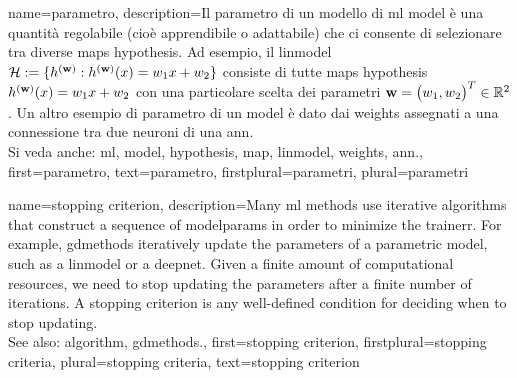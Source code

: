 {name={parametro},
	description={Il parametro di un modello di \gls{ml} \gls{model} è una quantità regolabile (cioè apprendibile o 
	adattabile) che ci consente di selezionare tra diverse \glspl{map} \gls{hypothesis}. Ad esempio, il \gls{linmodel} $\mathcal{H} := \{h^{({\bf w})}: h^{({\bf w})}(x)= w_{1} x + w_{2}\}$ 
		consiste di tutte \glspl{map} \gls{hypothesis} $h^{({\bf w})}(x)= w_{1} x + w_{2}$ 
		con una particolare scelta dei parametri ${\bf w} = \big(w_{1},w_{2}\big)^{T} \in \mathbb{R}^{2}$. 
		Un altro esempio di parametro di un \gls{model} è dato dai \gls{weights} assegnati a una connessione tra due neuroni di una \gls{ann}.
				\\
		Si veda anche: \gls{ml}, \gls{model}, \gls{hypothesis}, \gls{map}, \gls{linmodel}, \gls{weights}, \gls{ann}.},
		first={parametro},
		text={parametro},
		firstplural={parametri}, 
 		plural={parametri}
}

    
{name={stopping criterion},
	description={Many \gls{ml} methods use iterative \glspl{algorithm} 
		that construct a sequence of \glspl{modelparam} in order to minimize the \gls{trainerr}. 
		For example, \gls{gdmethods} iteratively update the \glspl{parameter} of a parametric \gls{model}, 
		such as a \gls{linmodel} or a \gls{deepnet}. Given a finite amount of computational 
		resources, we need to stop updating the \glspl{parameter} after a finite number of iterations. 
		A stopping criterion is any well-defined condition for deciding when to stop  
		updating.
				\\
		See also: \gls{algorithm}, \gls{gdmethods}.},
		first={stopping criterion},
		firstplural={stopping criteria},
		plural={stopping criteria}, 
		text={stopping criterion}
}

	
